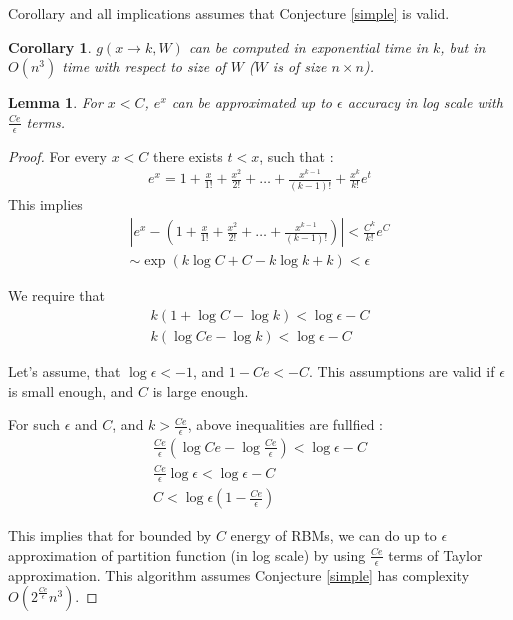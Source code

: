 \documentclass{article}
\newtheorem{lemma}[theorem]{Lemma}
\newtheorem{corollary}[theorem]{Corollary}
\begin{document}
Corollary and all implications assumes that Conjecture \ref{simple} is valid.

\begin{corollary}
	$g(x \rightarrow k, W)$
	can be computed in exponential time in $k$, but in $O(n^3)$ time with respect to size of $W$ ($W$ is of size $n \times n$).
\end{corollary}

\begin{lemma}
	For $x < C$, $e^x$ can be approximated up to $\epsilon$ accuracy in log scale with $\frac{Ce}{\epsilon}$ terms. 
\end{lemma}
\begin{proof}

For every $x < C$ there exists $t < x$, such that :  
\begin{align*}
	e^x = 1 + \frac{x}{1!} + \frac{x^2}{2!} + \dots + \frac{x^{k - 1}}{(k - 1)!} + \frac{x^k}{k!}e^t
\end{align*}
This implies
\begin{align*}
	|e^x - (1 + \frac{x}{1!} + \frac{x^2}{2!} + \dots + \frac{x^{k - 1}}{(k - 1)!}) | < \frac{C^k}{k!}e^C \\
	\sim \exp(k\log{C} + C - k\log{k} + k) < \epsilon
\end{align*}

We require that 
\begin{align*}
	k (1 + \log{C} - \log{k}) < \log{\epsilon} - C \\ 
	k (\log{Ce} - \log{k}) < \log{\epsilon} - C
\end{align*}

Let's assume, that $\log{\epsilon} < -1$, and $1 - Ce < -C$. This assumptions are valid if $\epsilon$ is small
enough, and $C$ is large enough.


For such $\epsilon$ and $C$, and $k > \frac{Ce}{\epsilon}$, above inequalities are fullfied :
\begin{align*}
	\frac{Ce}{\epsilon} (\log{Ce} - \log{\frac{Ce}{\epsilon}}) < \log{\epsilon} - C \\
	\frac{Ce}{\epsilon} \log{\epsilon} < \log{\epsilon} - C\\
	C < \log{\epsilon}(1 - \frac{Ce}{\epsilon})
\end{align*}

This implies that for bounded by $C$ energy of RBMs, we can do up to $\epsilon$ approximation of partition function (in log scale) by using
$\frac{Ce}{\epsilon}$ terms of Taylor approximation. This algorithm assumes Conjecture \ref{simple} has complexity
$O(2^{\frac{Ce}{\epsilon}}n^3)$.

\end{proof}
\end{document}
